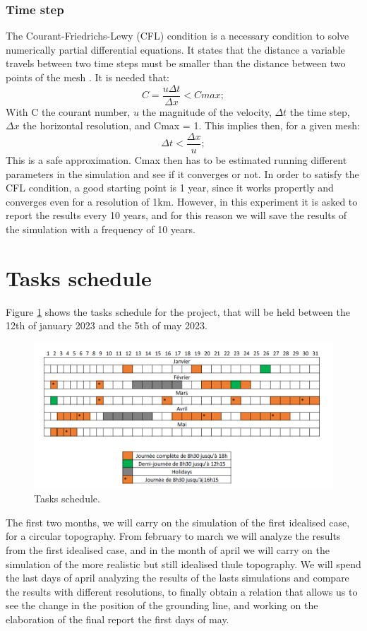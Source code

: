 \documentclass[a4paper,12pt]{article}
\begin{document}
\subsubsection{Time step}
The Courant-Friedrichs-Lewy (CFL) condition is a necessary condition to solve numerically partial differential equations. It states that the distance a variable travels between two time steps must be smaller than the distance between two points of the mesh \cite[]{courant1967partial}. It is needed that:
\begin{equation}
	C=\frac{u\Delta t}{\Delta x}<Cmax;
\end{equation}
With C the courant number, $u$ the magnitude of the velocity, $\Delta t$ the time step, $\Delta x$ the horizontal resolution, and Cmax = 1. This implies then, for a given mesh:
\begin{equation}
	\Delta t < \frac{\Delta x}{u};
\end{equation}
This is a safe approximation. Cmax then has to be estimated running different parameters in the simulation and see if it converges or not. In order to satisfy the CFL condition, a good starting point is 1 year, since it works propertly and converges even for a resolution of 1km.
However, in this experiment it is asked to report the results every 10 years, and for this reason we will save the results of the simulation with a frequency of 10 years. 
\section{Tasks schedule}
Figure \ref{Schedule} shows the tasks schedule for the project, that will be held between the 12th of january 2023 and the 5th of may 2023. 
\begin{figure}[!h]
	\centering
	\includegraphics[width=0.7\linewidth]{../fig/Schedule}
	\caption{Tasks schedule.}
	\label{Schedule}
\end{figure}
The first two months, we will carry on the simulation of the first idealised case, for a circular topography. From february to march we will analyze the results from the first idealised case, and in the month of april we will carry on the simulation of the more realistic but still idealised thule topography. We will spend the last days of april analyzing the results of the lasts simulations and compare the results with different resolutions, to finally obtain a relation that allows us to see the change in the position of the grounding line, and working on the elaboration of the final report the first days of may. 


\end{document}
